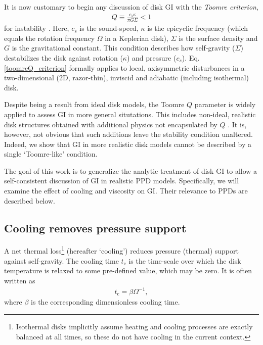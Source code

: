 \documentclass[iop, numberedappendix]{emulateapj}
\newcommand{\tcool}{t_\mathrm{c}}
\begin{document}
It is now customary to begin any discussion of disk GI with 
the \emph{Toomre criterion}, 
\begin{align}\label{toomreQ_criterion}
  Q \equiv \frac{c_s\kappa}{\pi G \Sigma}<1 
\end{align}
for instability \citep{toomre64}. Here, $c_s$ is the sound-speed,
$\kappa$ is the epicyclic 
frequency (which equals the rotation frequency $\Omega$ in a Keplerian
disk), $\Sigma$ is the surface density and $G$ is the
gravitational constant. This condition describes how self-gravity
($\Sigma$) destabilizes the disk against 
rotation ($\kappa$) and pressure ($c_s$). Eq. \ref{toomreQ_criterion}
formally applies to local, axisymmetric disturbances in a
two-dimensional (2D, razor-thin), inviscid and adiabatic (including
isothermal) disk. 


Despite being a result from ideal disk models, the Toomre $Q$  
parameter is widely applied to assess GI in more general 
situtations. This includes non-ideal, realistic disk structures
obtained with additional physics not encapsulated by $Q$
\citep[e.g.][]{kimura12}.  It is, however, not obvious that such additions
leave the stability condition unaltered. Indeed, we show that GI in more
realistic disk models cannot be described by a single `Toomre-like' 
condition.   


The goal of this work is to generalize the analytic treatment of disk 
GI to allow a self-consistent discussion of GI in 
realistic PPD models. Specifically, we will examine the effect of
cooling and viscosity on GI. Their relevance to PPDs are described
below. 


\subsection{Cooling removes pressure support}
A net thermal loss\footnote{Isothermal disks implicitly assume 
  heating and cooling processes are exactly balanced at all
  times, so these do not have cooling in the current context.} (hereafter `cooling')
reduces pressure (thermal) support against self-gravity. The cooling time 
$\tcool$ is the time-scale over which the disk temperature is relaxed
to some pre-defined value, which may be zero. It is 
often written as 
\begin{align} 
  \tcool = \beta \Omega^{-1},
\end{align}
where $\beta$ is the corresponding dimensionless cooling time. 
\end{document}
